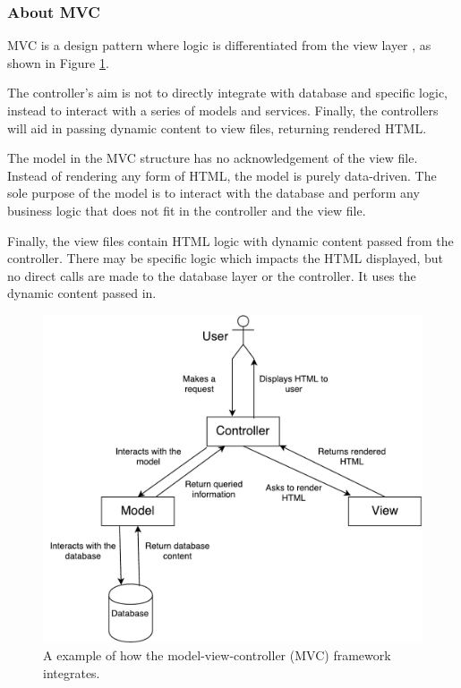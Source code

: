 \subsubsection{About MVC}
MVC is a design pattern where logic is differentiated from the view layer \cite{Gamma:1995:DPE:186897}, as shown in Figure \ref{fig:mvc}.

The controller's aim is not to directly integrate with database and specific logic, instead to interact with a series of models and services. Finally, the controllers will aid in passing dynamic content to view files, returning rendered HTML.

The model in the MVC structure has no acknowledgement of the view file. Instead of rendering any form of HTML, the model is purely data-driven. The sole purpose of the model is to interact with the database and perform any business logic that does not fit in the controller and the view file.

Finally, the view files contain HTML logic with dynamic content passed from the controller. There may be specific logic which impacts the HTML displayed, but no direct calls are made to the database layer or the controller. It uses the dynamic content passed in.

\begin{figure}[H]
  \centering
  \includegraphics[scale=0.38]{images/MVC.pdf}
  \caption{A example of how the model-view-controller (MVC) framework integrates.}
  \label{fig:mvc}
\end{figure}

